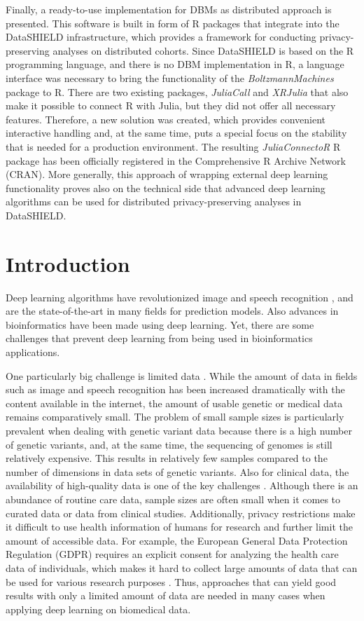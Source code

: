 \documentclass[12pt]{article}
\newcommand{\apkg}[1]{\emph{#1}}
\begin{document}
Finally, a ready-to-use implementation for DBMs as distributed approach is presented.
This software is built in form of R packages that integrate into the DataSHIELD infrastructure, which provides a framework for conducting privacy-preserving analyses on distributed cohorts.
Since DataSHIELD is based on the R programming language, and there is no DBM implementation in R, a language interface was necessary to bring the functionality of the \apkg{BoltzmannMachines} package to R.
There are two existing packages, \apkg{JuliaCall} and \apkg{XRJulia} that also make it possible to connect R with Julia, but they did not offer all necessary features.
Therefore, a new solution was created, which provides convenient interactive handling and, at the same time, puts a special focus on the stability that is needed for a production environment.
The resulting \apkg{JuliaConnectoR} R package has been officially registered in the Comprehensive R Archive Network (CRAN).
More generally, this approach of wrapping external deep learning functionality proves also on the technical side that advanced deep learning algorithms can be used for distributed privacy-preserving analyses in DataSHIELD.


\clearpage
\section{Introduction}

Deep learning algorithms have revolutionized image and speech recognition \citep{goodfellow_deep_2016}, and are the state-of-the-art in many fields for prediction models.
Also advances in bioinformatics have been made using deep learning.
Yet, there are some challenges that prevent deep learning from being used in bioinformatics applications. 

One particularly big challenge is limited data \citep{min_deep_2017}.
While the amount of data in fields such as image and speech recognition has been increased dramatically with the content available in the internet, the amount of usable genetic or medical data remains comparatively small.
The problem of small sample sizes is particularly prevalent when dealing with genetic variant data
because there is a high number of genetic variants, and, at the same time, the sequencing of genomes is still relatively expensive.
This results in relatively few samples compared to the number of dimensions in data sets of genetic variants.
Also for clinical data, the availability of high-quality data is one of the key challenges \citep{machine_learning_review_nejm}.
Although there is an abundance of routine care data, sample sizes are often small when it comes to curated data or data from clinical studies.
Additionally, privacy restrictions make it difficult to use health information of humans for research and further limit the amount of accessible data.
For example, the European General Data Protection Regulation (GDPR) requires an explicit consent for analyzing the health care data of individuals, which makes it hard to collect large amounts of data that can be used for various research purposes \citep{rumbold_effect_2017}.
Thus, approaches that can yield good results with only a limited amount of data are needed in many cases when applying deep learning on biomedical data.
\end{document}
